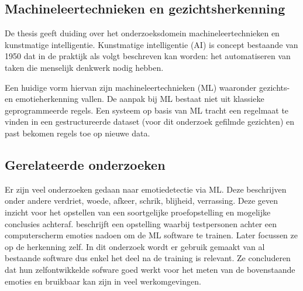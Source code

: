 %



\subsection{Machineleertechnieken en gezichtsherkenning}
De thesis \textcite{Jonsson2018} geeft duiding over het onderzoeksdomein machineleertechnieken en kunstmatige intelligentie. Kunstmatige intelligentie (AI) is concept bestaande van 1950 dat in de praktijk als volgt beschreven kan worden: het automatiseren van taken die menselijk denkwerk nodig hebben. 

Een huidige vorm hiervan zijn machineleertechnieken (ML) waaronder gezichts- en emotieherkenning vallen. De aanpak bij ML bestaat niet uit klassieke geprogrammeerde regels. Een systeem op basis van ML tracht een regelmaat te vinden in een gestructureerde dataset (voor dit onderzoek gefilmde gezichten) en past bekomen regels toe op nieuwe data. 

\subsection{Gerelateerde onderzoeken}
Er zijn veel onderzoeken gedaan naar emotiedetectie via ML. Deze beschrijven onder andere verdriet, woede, afkeer, schrik, blijheid, verrassing. Deze geven inzicht voor het opstellen van een soortgelijke proefopstelling en mogelijke conclusies achteraf. \textcite{Bahreini2014} beschrijft een opstelling waarbij testpersonen achter een computerscherm emoties nadoen om de ML software te trainen. Later focussen ze op de herkenning zelf. In dit onderzoek wordt er gebruik gemaakt van al bestaande software dus enkel het deel na de training is relevant. Ze concluderen dat hun zelfontwikkelde sofware goed werkt voor het meten van de bovenstaande emoties en bruikbaar kan zijn in veel werkomgevingen.

